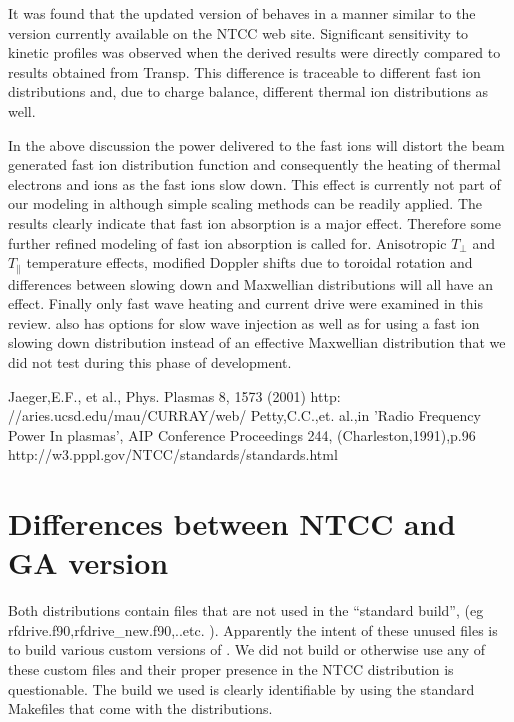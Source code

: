  It was found that the updated version of \ct behaves in a manner
 similar to the version currently available on the NTCC web site. Significant sensitivity
 to kinetic profiles  was
 observed when the \ot derived results were directly compared to
 results obtained from Transp. This difference  is traceable to
 different fast ion distributions and, due to charge balance,
 different thermal ion distributions as well.
 

    In the above discussion the power delivered to the fast ions 
  will distort the beam generated
  fast ion distribution  function and consequently the heating of thermal
  electrons and ions as the fast ions slow down. This effect is
  currently not part of our modeling in \ot although simple scaling 
 methods can be readily applied.  The results clearly indicate that fast ion
  absorption is a major effect. Therefore some further refined
  modeling of fast ion absorption is called for. Anisotropic
  $T_{\perp}$  and $ T_{\parallel}$ temperature effects, modified Doppler shifts
    due to toroidal rotation and differences between slowing down and
    Maxwellian distributions will  all have an effect.
 Finally only fast wave heating and current drive were examined in this review.
\ct also has  options for slow wave injection as well as for using a fast ion
slowing down distribution instead of an effective Maxwellian
distribution  that  we did  not  test during this
phase of development. 
\begin{thebibliography}{5}
 Jaeger,E.F., et al., Phys. Plasmas 8, 1573 (2001)
  http: //aries.ucsd.edu/mau/CURRAY/web/
  Petty,C.C.,et. al.,in 'Radio Frequency Power In plasmas',
              AIP Conference Proceedings 244, (Charleston,1991),p.96
  http://w3.pppl.gov/NTCC/standards/standards.html
\end{thebibliography}
\appendix
\section{
 Differences between NTCC and GA version}
 Both distributions contain files that are not used in the ``standard
 build'',
 (eg rfdrive.f90,rfdrive\_new.f90,..etc. ).  Apparently the intent of
 these unused files is to build various custom versions of \ct. 
 We did not build or otherwise use any of these custom files
 and their proper presence in the NTCC distribution is  questionable.
 The build we used is clearly identifiable by using the standard
 Makefiles that come with the distributions. 

